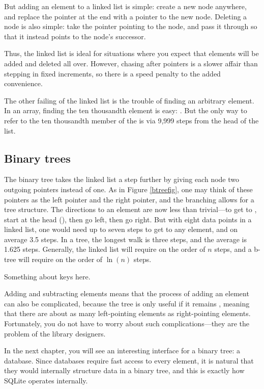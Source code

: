 But adding an element to a linked list is simple: create a new node
anywhere, and replace the  pointer at the end with a pointer to
the new node. Deleting a node is also simple: take the pointer pointing
to the node, and pass it through so that it instead points to the node's
successor. 

Thus, the linked list is ideal for situations where you expect that
elements will be added and deleted all over. However, chasing after
pointers is a slower affair than stepping in fixed increments, so there
is a speed penalty to the added convenience.

The other failing of the linked list is the trouble of finding an
arbitrary element.  In an array, finding the ten thousandth element is
easy: . But the only way to refer to the ten
thousandth member of the  is via 9,999 
steps from the head of the list. 



\subsection{Binary trees} The binary tree takes the linked list a step further
by giving each node two outgoing pointers instead of one. As in Figure
\ref{btreefig}, one may think of these pointers as the left pointer and
the right pointer, and the branching allows for a tree structure. The
directions to an element are now less than trivial---to get to
, start at the head (), then go left, then go right.
But with eight data points in a linked list, one would need up to seven
steps to get to any element, and on average 3.5 steps. In a tree, the
longest walk is three steps, and the average is 1.625 steps. Generally,
the linked list will require on the order of $n$ steps, and a b-tree
will require on the order of $\ln(n)$ steps.

Something about keys here.

Adding and subtracting elements means that the process of adding an element 
can also be complicated, because the tree is only useful if it remains
, meaning that there are about as many left-pointing
elements as right-pointing elements. Fortunately, you do not have to
worry about such com\-pli\-ca\-tions---they are the problem of the library
designers.

In the next chapter, you will see an interesting interface for a binary
tree: a database. Since databases require fast access to every element, 
it is natural that they would internally structure data in a binary
tree, and this is exactly how SQLite operates internally.

